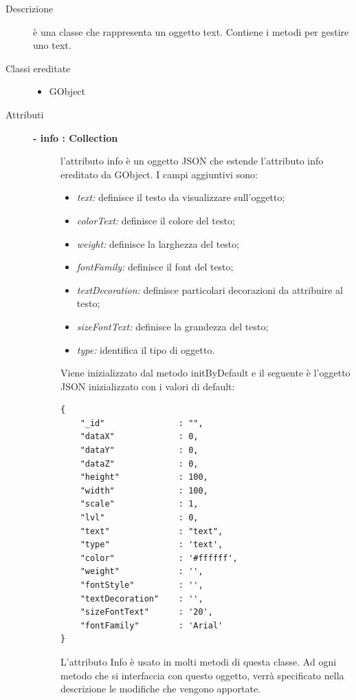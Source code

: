 \begin{description}
\item[Descrizione] \hfill
	è una classe che rappresenta un oggetto text. Contiene i metodi per gestire uno text.
	
\item[Classi ereditate] \hfill
	\begin{itemize}
		\item GObject
	\end{itemize}
	
\item[Attributi] \hfill
	\begin{description}
		\item[\textbf{- info : Collection			}] \hfill
			l'attributo info è un oggetto JSON che estende l'attributo info ereditato da GObject. I campi aggiuntivi sono:
	\begin{itemize}
		\item \textit{text:} definisce il testo da visualizzare sull'oggetto;
		\item \textit{colorText:} definisce il colore del testo;		
		\item \textit{weight:} definisce la larghezza del testo;
        \item \textit{fontFamily:} definisce il font del testo;
        \item \textit{textDecoration:} definisce particolari decorazioni da attribuire al testo; 
        \item \textit{sizeFontText:} definisce la grandezza del testo;
		\item \textit{type:} identifica il tipo di oggetto.		
	\end{itemize}
	Viene inizializzato dal metodo initByDefault e il seguente è l'oggetto JSON inizializzato con i valori di default:
\begin{lstlisting}
{
    "_id"               : "",    
    "dataX"             : 0,
    "dataY"             : 0,
    "dataZ"             : 0,
    "height"            : 100,
    "width"             : 100,
    "scale"             : 1,
    "lvl"               : 0,
    "text"              : "text",
    "type"              : 'text',
    "color"             : '#ffffff',
    "weight"            : '',
    "fontStyle"         : '',
    "textDecoration"    : '',
    "sizeFontText"      : '20',
    "fontFamily"        : 'Arial'
}
\end{lstlisting}					
                 L'attributo Info è usato in molti metodi di questa classe. Ad ogni metodo che si interfaccia con questo oggetto, verrà specificato nella descrizione le modifiche che vengono apportate.
	\end{description}
	

\end{description}
